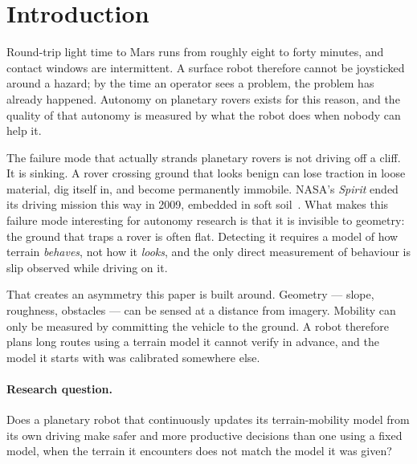 \documentclass[11pt]{article}
\begin{document}
\section{Introduction}

Round-trip light time to Mars runs from roughly eight to forty minutes, and
contact windows are intermittent. A surface robot therefore cannot be
joysticked around a hazard; by the time an operator sees a problem, the
problem has already happened. Autonomy on planetary rovers exists for this
reason, and the quality of that autonomy is measured by what the robot does
when nobody can help it.

The failure mode that actually strands planetary rovers is not driving off a
cliff. It is sinking. A rover crossing ground that looks benign can lose
traction in loose material, dig itself in, and become permanently immobile.
NASA's \emph{Spirit} ended its driving mission this way in 2009, embedded in
soft soil~\cite{nasa_spirit}. What makes this failure mode interesting for autonomy research is
that it is invisible to geometry: the ground that traps a rover is often flat.
Detecting it requires a model of how terrain \emph{behaves}, not how it
\emph{looks}, and the only direct measurement of behaviour is slip observed
while driving on it.

That creates an asymmetry this paper is built around. Geometry --- slope,
roughness, obstacles --- can be sensed at a distance from imagery. Mobility
can only be measured by committing the vehicle to the ground. A robot
therefore plans long routes using a terrain model it cannot verify in advance,
and the model it starts with was calibrated somewhere else.

\paragraph{Research question.}
Does a planetary robot that continuously updates its terrain-mobility model
from its own driving make safer and more productive decisions than one using a
fixed model, when the terrain it encounters does not match the model it was
given?
\end{document}
